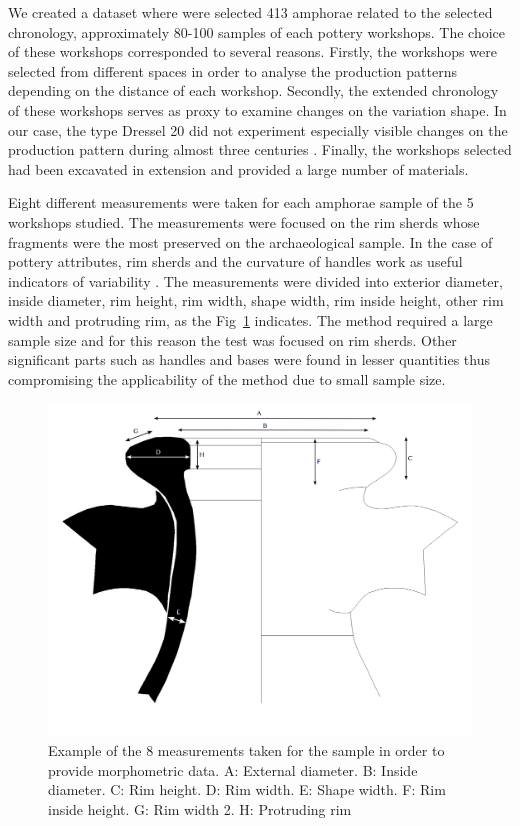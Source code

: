 \documentclass[review]{elsarticle}
\begin{document}
We created a dataset where were selected 413 amphorae related to the selected chronology, approximately 80-100 samples of each pottery workshops. The choice of these workshops corresponded to several reasons. Firstly, the workshops were selected from different spaces in order to analyse the production patterns depending on the distance of each workshop. Secondly, the extended chronology of these workshops serves as proxy to examine changes on the variation shape. In our case, the type Dressel 20 did not experiment especially visible changes on the production pattern during almost three centuries \citep{berni_dressel_2016}. Finally, the workshops selected had been excavated in extension and provided a large number of materials.   

Eight different measurements were taken for each amphorae sample of the 5 workshops studied. The measurements were focused on the rim sherds whose fragments were the most preserved on the archaeological sample. In the case of pottery attributes, rim sherds and the curvature of handles work as useful indicators of variability \citep{berni_millet_epigrafianforica_2008}. The measurements were divided into exterior diameter, inside diameter, rim height, rim width, shape width, rim inside height, other rim width and protruding rim, as the Fig~\ref{mesures} indicates. The method required a large sample size and for this reason the test was focused on rim sherds. Other significant parts such as handles and bases were found in lesser quantities thus compromising the applicability of the method due to small sample size.

\begin{figure}[htp]
	\centering
\includegraphics[scale=0.10]{mesures.png}
\caption{Example of the 8 measurements taken for the sample in order to provide morphometric data. A: External diameter. B: Inside diameter. C: Rim height. D: Rim width. E: Shape width. F: Rim inside height. G: Rim width 2. H: Protruding rim}
\label{mesures}
\end{figure} 
\end{document}
